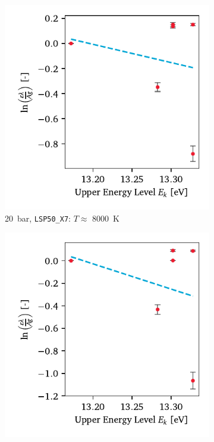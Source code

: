             \begin{figure}[h]
                \centering
                \begin{subfigure}[t]{0.47\textwidth}
                    \centering
                    \includegraphics[width=\textwidth]{assets/5 results/spectrum_LSP50_X7_boltzmann}
                    \caption{\qty{20}{bar}, \texttt{LSP50\_X7}: $T \approx$ \qty{8000}{K}}
                    \label{fig:boltzmann_LSP50_X7}
                \end{subfigure}
                \hfill
                \begin{subfigure}[t]{0.47\textwidth}
                    \centering
                    \includegraphics[width=\textwidth]{assets/5 results/spectrum_LSP60_S9_boltzmann}

\end{subfigure}
\end{figure}

